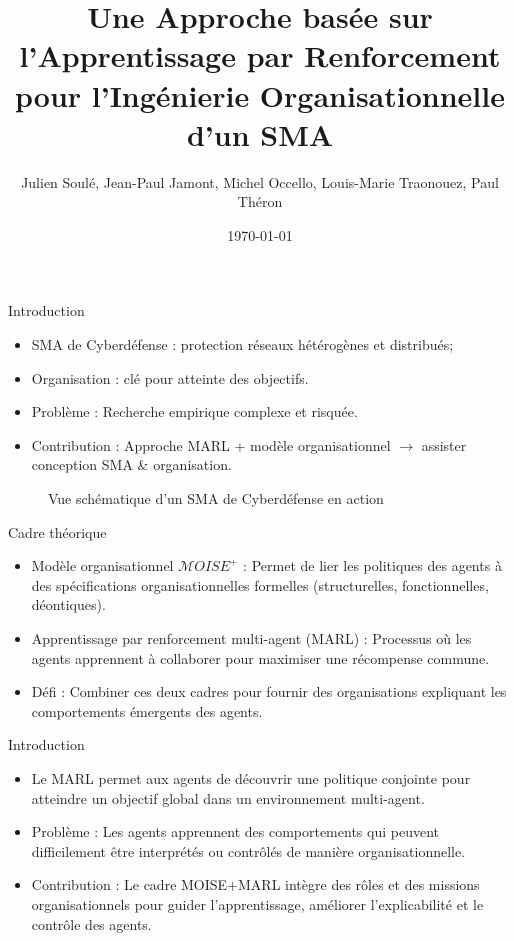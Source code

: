 \documentclass{beamer}
\title{Une Approche basée sur l'Apprentissage par Renforcement pour l'Ingénierie Organisationnelle d'un SMA}
\author{Julien Soulé, Jean-Paul Jamont, Michel Occello, Louis-Marie Traonouez, Paul Théron}
\date{\today}
\begin{document}
\begin{frame}
  \titlepage
\end{frame}

\begin{frame}{Introduction}
    \begin{itemize}
        \item SMA de Cyberdéfense : protection réseaux hétérogènes et distribués;
        \item Organisation : clé pour atteinte des objectifs.
        \item Problème : Recherche empirique complexe et risquée.
        \item Contribution : Approche MARL + modèle organisationnel $\rightarrow$ assister conception SMA \& organisation.
    \end{itemize}

    \begin{figure}
        \centering
        
        \caption{Vue schématique d'un SMA de Cyberdéfense en action}
        \label{fig:my_label}
    \end{figure}

\end{frame}

\begin{frame}{Cadre théorique}
    \begin{itemize}
        \item Modèle organisationnel $\mathcal{M}OISE^+$ : Permet de lier les politiques des agents à des spécifications organisationnelles formelles (structurelles, fonctionnelles, déontiques).
        \item Apprentissage par renforcement multi-agent (MARL) : Processus où les agents apprennent à collaborer pour maximiser une récompense commune.
        \item Défi : Combiner ces deux cadres pour fournir des organisations expliquant les comportements émergents des agents.
    \end{itemize}
\end{frame}


\begin{frame}{Introduction}
    \begin{itemize}
        \item Le MARL permet aux agents de découvrir une politique conjointe pour atteindre un objectif global dans un environnement multi-agent.
        \item Problème : Les agents apprennent des comportements qui peuvent difficilement être interprétés ou contrôlés de manière organisationnelle.
        \item Contribution : Le cadre MOISE+MARL intègre des rôles et des missions organisationnels pour guider l'apprentissage, améliorer l'explicabilité et le contrôle des agents.
    \end{itemize}
\end{frame}
\end{document}
